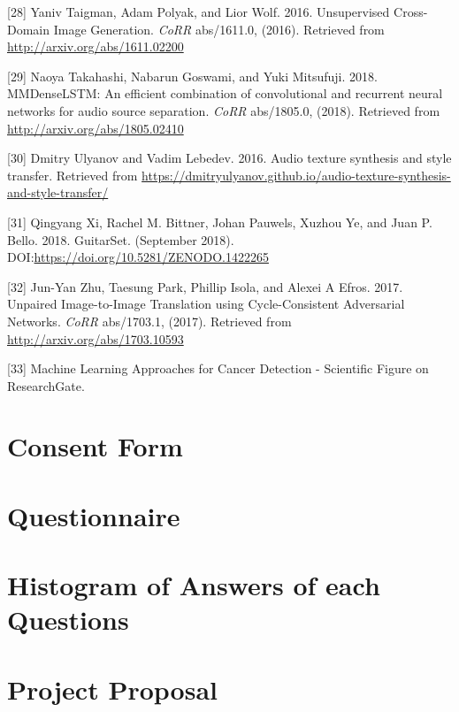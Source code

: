 \documentclass[12pt,a4paper,]{report}
\begin{document}
\leavevmode\hypertarget{ref-DBLP:journalsux2fcorrux2fTaigmanPW16}{}%
{[}28{]} Yaniv Taigman, Adam Polyak, and Lior Wolf. 2016. Unsupervised
Cross-Domain Image Generation. \emph{CoRR} abs/1611.0, (2016). Retrieved
from \url{http://arxiv.org/abs/1611.02200}

\leavevmode\hypertarget{ref-DBLP:journalsux2fcorrux2fabs-1805-02410}{}%
{[}29{]} Naoya Takahashi, Nabarun Goswami, and Yuki Mitsufuji. 2018.
MMDenseLSTM: An efficient combination of convolutional and recurrent
neural networks for audio source separation. \emph{CoRR} abs/1805.0,
(2018). Retrieved from \url{http://arxiv.org/abs/1805.02410}

\leavevmode\hypertarget{ref-Ulyanov2016}{}%
{[}30{]} Dmitry Ulyanov and Vadim Lebedev. 2016. Audio texture synthesis
and style transfer. Retrieved from
\url{https://dmitryulyanov.github.io/audio-texture-synthesis-and-style-transfer/}

\leavevmode\hypertarget{ref-Xi2018}{}%
{[}31{]} Qingyang Xi, Rachel M. Bittner, Johan Pauwels, Xuzhou Ye, and
Juan P. Bello. 2018. GuitarSet. (September 2018).
DOI:\url{https://doi.org/10.5281/ZENODO.1422265}

\leavevmode\hypertarget{ref-DBLP:journalsux2fcorrux2fZhuPIE17}{}%
{[}32{]} Jun-Yan Zhu, Taesung Park, Phillip Isola, and Alexei A Efros.
2017. Unpaired Image-to-Image Translation using Cycle-Consistent
Adversarial Networks. \emph{CoRR} abs/1703.1, (2017). Retrieved from
\url{http://arxiv.org/abs/1703.10593}

\leavevmode\hypertarget{ref-fcn_figure}{}%
{[}33{]} Machine Learning Approaches for Cancer Detection - Scientific
Figure on ResearchGate.

\appendix

\hypertarget{consent-form}{%
\chapter{Consent Form}\label{consent-form}}

\hypertarget{questionnaire}{%
\chapter{Questionnaire}\label{questionnaire}}

\hypertarget{histogram-of-answers-of-each-questions}{%
\chapter{Histogram of Answers of each
Questions}\label{histogram-of-answers-of-each-questions}}

\hypertarget{project-proposal}{%
\chapter{Project Proposal}\label{project-proposal}}
\end{document}
